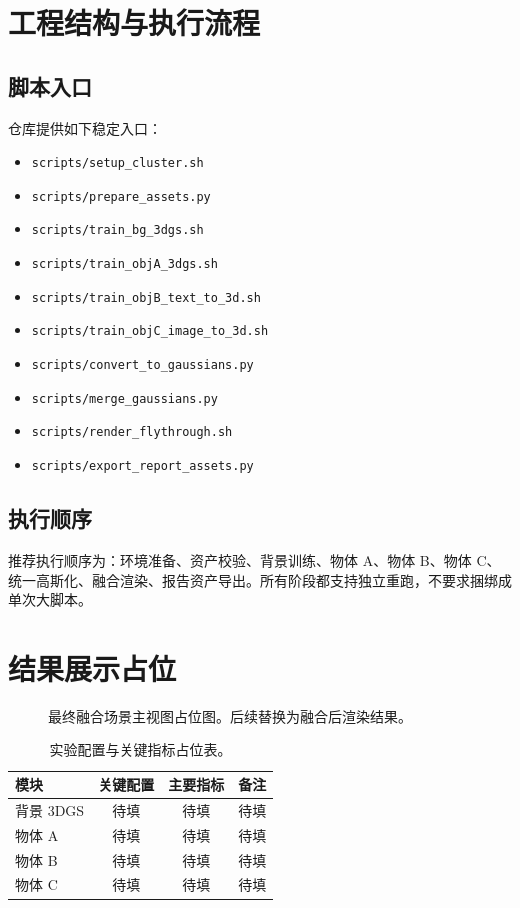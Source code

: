 \documentclass{article}
\begin{document}
\section{工程结构与执行流程}
\subsection{脚本入口}
仓库提供如下稳定入口：
\begin{itemize}
  \item \texttt{scripts/setup\_cluster.sh}
  \item \texttt{scripts/prepare\_assets.py}
  \item \texttt{scripts/train\_bg\_3dgs.sh}
  \item \texttt{scripts/train\_objA\_3dgs.sh}
  \item \texttt{scripts/train\_objB\_text\_to\_3d.sh}
  \item \texttt{scripts/train\_objC\_image\_to\_3d.sh}
  \item \texttt{scripts/convert\_to\_gaussians.py}
  \item \texttt{scripts/merge\_gaussians.py}
  \item \texttt{scripts/render\_flythrough.sh}
  \item \texttt{scripts/export\_report\_assets.py}
\end{itemize}

\subsection{执行顺序}
推荐执行顺序为：环境准备、资产校验、背景训练、物体 A、物体 B、物体 C、统一高斯化、融合渲染、报告资产导出。所有阶段都支持独立重跑，不要求捆绑成单次大脚本。

\section{结果展示占位}
\begin{figure}[t]
  \centering
  \fbox{\rule{0pt}{1.8in}\rule{0.85\linewidth}{0pt}}
  \caption{最终融合场景主视图占位图。后续替换为融合后渲染结果。}
  \label{fig:fusion_teaser}
\end{figure}

\begin{table}[t]
  \centering
  \caption{实验配置与关键指标占位表。}
  \begin{tabular}{lccc}
    \toprule
    模块 & 关键配置 & 主要指标 & 备注 \\
    \midrule
    背景 3DGS & 待填 & 待填 & 待填 \\
    物体 A & 待填 & 待填 & 待填 \\
    物体 B & 待填 & 待填 & 待填 \\
    物体 C & 待填 & 待填 & 待填 \\
    \bottomrule
  \end{tabular}
  \label{tab:summary}
\end{table}
\end{document}
